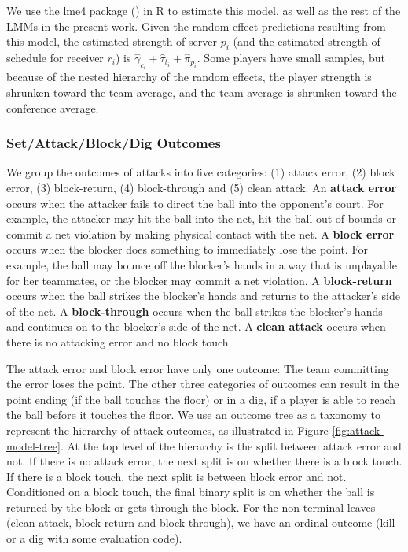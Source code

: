 \documentclass[USenglish]{article}
\theoremstyle{dgthm}
\theoremstyle{dgdef}
\begin{document}
We use the lme4 package (\cite{bates_etal_2015}) in R to estimate this model, as well as the rest of the LMMs in the present work. Given the random effect predictions resulting from this model, the estimated strength of server $p_i$ (and the estimated strength of schedule for receiver $r_i$) is $\hat\gamma_{c_i} + \hat\tau_{t_i} + \hat\pi_{p_i}$. Some players have small samples, but because of the nested hierarchy of the random effects, the player strength is shrunken toward the team average, and the team average is shrunken toward the conference average.

\subsubsection{Set/Attack/Block/Dig Outcomes}
\label{sec:sos-attack}

We group the outcomes of attacks into five categories: (1) attack error, (2) block error, (3) block-return, (4) block-through and (5) clean attack. An {\bf attack error} occurs when the attacker fails to direct the ball into the opponent's court. For example, the attacker may hit the ball into the net, hit the ball out of bounds or commit a net violation by making physical contact with the net. A {\bf block error} occurs when the blocker does something to immediately lose the point. For example, the ball may bounce off the blocker's hands in a way that is unplayable for her teammates, or the blocker may commit a net violation. A {\bf block-return} occurs when the ball strikes the blocker's hands and returns to the attacker's side of the net. A {\bf block-through} occurs when the ball strikes the blocker's hands and continues on to the blocker's side of the net. A {\bf clean attack} occurs when there is no attacking error and no block touch.

The attack error and block error have only one outcome: The team committing the error loses the point. The other three categories of outcomes can result in the point ending (if the ball touches the floor) or in a dig, if a player is able to reach the ball before it touches the floor. We use an outcome tree as a taxonomy to represent the hierarchy of attack outcomes, as illustrated in Figure \ref{fig:attack-model-tree}. At the top level of the hierarchy is the split between attack error and not. If there is no attack error, the next split is on whether there is a block touch. If there is a block touch, the next split is between block error and not. Conditioned on a block touch, the final binary split is on whether the ball is returned by the block or gets through the block. For the non-terminal leaves (clean attack, block-return and block-through), we have an ordinal outcome (kill or a dig with some evaluation code).
\end{document}
